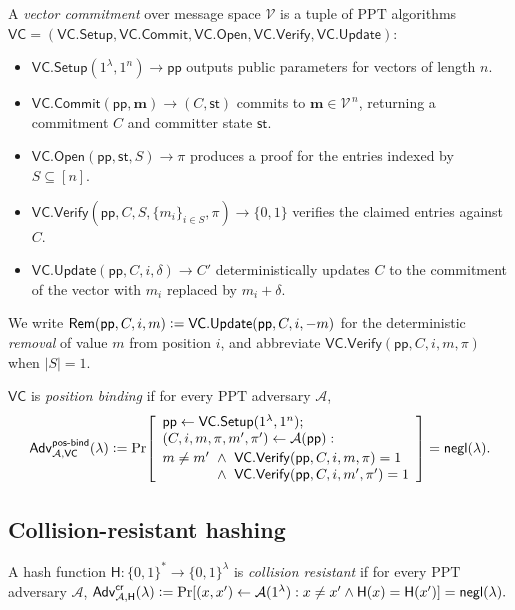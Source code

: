 \documentclass[version=submission]{iacrcc}
\theoremstyle{definition}
\newcommand{\secpar}{\lambda}
\newcommand{\negl}{\mathsf{negl}}
\newcommand{\PPT}{\mathrm{PPT}}
\newcommand{\bit}{\{0,1\}}
\newcommand{\defeq}{\vcentcolon=}
\newcommand{\Setup}{\mathsf{Setup}}
\newcommand{\Commit}{\mathsf{Commit}}
\newcommand{\Open}{\mathsf{Open}}
\newcommand{\Vfy}{\mathsf{Verify}}
\newcommand{\Update}{\mathsf{Update}}
\newcommand{\Rem}{\mathsf{Rem}}
\newcommand{\pp}{\mathsf{pp}}
\newcommand{\aux}{\mathsf{st}}
\newcommand{\Adv}{\mathsf{Adv}}
\newcommand{\A}{\mathcal{A}}
\newcommand{\Vsp}{\mathcal{V}}
\newcommand{\hash}{\mathsf{H}}
\newcommand{\VC}{\mathsf{VC}}
\newcommand{\posbind}{\mathsf{pos\text{-}bind}}
\newcommand{\collres}{\mathsf{cr}}
\begin{document}
\begin{definition}\label{def:vc}
A \emph{vector commitment} over message space $\Vsp$ is a tuple of $\PPT$
algorithms $\VC=(\VC.\Setup,\VC.\Commit,\VC.\Open,\VC.\Vfy,\VC.\Update)$:
\begin{itemize}[leftmargin=1.4em,itemsep=2pt]
  \item $\VC.\Setup(1^\secpar,1^n)\to\pp$ outputs public parameters for vectors
        of length $n$.
  \item $\VC.\Commit(\pp,\mathbf{m})\to(C,\aux)$ commits to
        $\mathbf{m}\in\Vsp^{\,n}$, returning a commitment $C$ and committer state
        $\aux$.
  \item $\VC.\Open(\pp,\aux,S)\to\pi$ produces a proof for the entries indexed by
        $S\subseteq[n]$.
  \item $\VC.\Vfy(\pp,C,S,\{m_i\}_{i\in S},\pi)\to\bit$ verifies the claimed
        entries against $C$.
  \item $\VC.\Update(\pp,C,i,\delta)\to C'$ deterministically updates $C$ to the
        commitment of the vector with $m_i$ replaced by $m_i+\delta$.
\end{itemize}
We write $\Rem(\pp,C,i,m)\defeq\VC.\Update(\pp,C,i,-m)$ for the deterministic
\emph{removal} of value $m$ from position $i$, and abbreviate
$\VC.\Vfy(\pp,C,i,m,\pi)$ when $|S|=1$.
\end{definition}

\begin{definition}\label{def:posbind}
$\VC$ is \emph{position binding} if for every $\PPT$ adversary $\A$,
\[
  \Adv^{\posbind}_{\A,\VC}(\secpar)\defeq
  \Pr\!\left[
    \begin{array}{l}
      \pp\leftarrow\VC.\Setup(1^\secpar,1^n);\\
      (C,i,m,\pi,m',\pi')\leftarrow\A(\pp):\\[2pt]
      m\neq m'\ \wedge\ \VC.\Vfy(\pp,C,i,m,\pi)=1\\
      \hphantom{m\neq m'}\ \wedge\ \VC.\Vfy(\pp,C,i,m',\pi')=1
    \end{array}
  \right]=\negl(\secpar).
\]
\end{definition}

\subsection{Collision-resistant hashing}

\begin{definition}[CRHF]\label{def:crhf}
A hash function $\hash:\bit^{*}\to\bit^{\secpar}$ is \emph{collision resistant}
if for every $\PPT$ adversary $\A$,
$\Adv^{\collres}_{\A,\hash}(\secpar)\defeq
 \Pr[(x,x')\leftarrow\A(1^\secpar):x\neq x'\wedge\hash(x)=\hash(x')]
 =\negl(\secpar).$
\end{definition}
\end{document}
